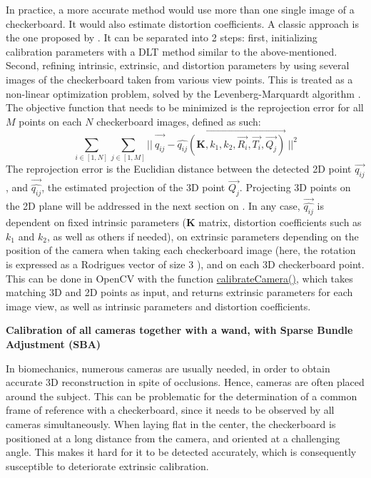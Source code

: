In practice, a more accurate method would use more than one single image of a checkerboard. It would also estimate distortion coefficients. A classic approach is the one proposed by \cite{Zhang2000}. It can be separated into 2 steps: first, initializing calibration parameters with a DLT method similar to the above-mentioned. Second, refining intrinsic, extrinsic, and distortion parameters by using several images of the checkerboard taken from various view points. This is treated as a non-linear optimization problem, solved by the Levenberg-Marquardt algorithm \cite{Marquardt1963,More1978}. The objective function that needs to be minimized is the reprojection error for all $M$ points on each $N$ checkerboard images, defined as such:
\begin{equation}\label{eq:LM_algo}
  \sum_{i \in [1,N]} \sum_{j \in [1,M]} 
  ||\ \overrightarrow{q_{ij}^{\ ^{\ ^{\ ^{\ }}}}} -
  \overrightarrow{\widehat{q_{ij}}(\textbf{K},k_1,k_2,\overrightarrow{R_i},\overrightarrow{T_i},\overrightarrow{Q_j})}\ 
  ||^2
\end{equation} 
The reprojection error is the Euclidian distance between the detected 2D point $\overrightarrow{q_{ij}}$, and $\overrightarrow{\widehat{q_{ij}}}$, the estimated projection of the 3D point $\overrightarrow{Q_j}$. Projecting 3D points on the 2D plane will be addressed in the next section on . In any case, $\overrightarrow{\widehat{q_{ij}}}$ is dependent on fixed intrinsic parameters (\textbf{K} matrix, distortion coefficients such as $k_1$ and $k_2$, as well as others if needed), on extrinsic parameters depending on the position of the camera when taking each checkerboard image (here, the rotation is expressed as a Rodrigues vector of size 3 \cite{Gallego2015}), and on each 3D checkerboard point. This can be done in OpenCV with the function \href{https://docs.opencv.org/4.x/d9/d0c/group__calib3d.html#ga3207604e4b1a1758aa66acb6ed5aa65d}{calibrateCamera()}, which takes matching 3D and 2D points as input, and returns extrinsic parameters for each image view, as well as intrinsic parameters and distortion coefficients.

\vspace*{0.5cm}
\noindent\textbf{Calibration of all cameras together with a wand, with Sparse Bundle Adjustment (SBA)} 

In biomechanics, numerous cameras are usually needed, in order to obtain accurate 3D reconstruction in spite of occlusions. Hence, cameras are often placed around the subject. This can be problematic for the determination of a common frame of reference with a checkerboard, since it needs to be observed by all cameras simultaneously. When laying flat in the center, the checkerboard is positioned at a long distance from the camera, and oriented at a challenging angle. This makes it hard for it to be detected accurately, which is consequently susceptible to deteriorate extrinsic calibration. 

